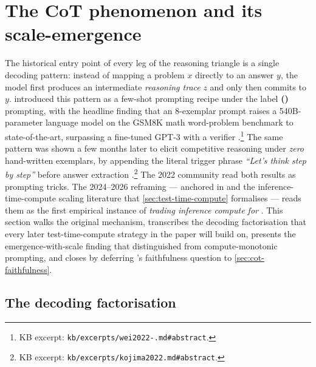
\section{The CoT phenomenon and its scale-emergence}
\label{sec:cot-phenomenon}

The historical entry point of every leg of the reasoning triangle is a
single decoding pattern: instead of mapping a problem $x$ directly to an
answer $y$, the model first produces an intermediate \emph{reasoning
trace} $z$ and only then commits to $y$. \citet{wei2022-cot} introduced
this pattern as a few-shot prompting recipe under the label
\textbf{ ()} prompting, with the headline finding
that an 8-exemplar  prompt raises a 540B-parameter language model on
the GSM8K math word-problem benchmark to state-of-the-art, surpassing a
fine-tuned GPT-3 with a verifier
\citep[abstract]{wei2022-cot}.\footnote{KB excerpt:
\texttt{kb/excerpts/wei2022-.md\#abstract}.} The same pattern was
shown a few months later to elicit competitive reasoning under
\emph{zero} hand-written exemplars, by appending the literal trigger
phrase \emph{``Let's think step by step''} before answer extraction
\citep[abstract]{kojima2022}.\footnote{KB excerpt:
\texttt{kb/excerpts/kojima2022.md\#abstract}.} The 2022 community read
both results as prompting tricks. The 2024--2026 reframing — anchored
in \citet{snell2024} and the inference-time-compute scaling literature
that \cref{sec:test-time-compute} formalises — reads them as the first
empirical instance of \emph{trading inference compute for }.
This section walks the original mechanism, transcribes the decoding
factorisation that every later test-time-compute strategy in the paper
will build on, presents the emergence-with-scale finding that
distinguished  from compute-monotonic prompting, and closes by
deferring 's faithfulness question to \cref{sec:cot-faithfulness}.

\subsection{The decoding factorisation}
\label{sec:cot-decoding}

